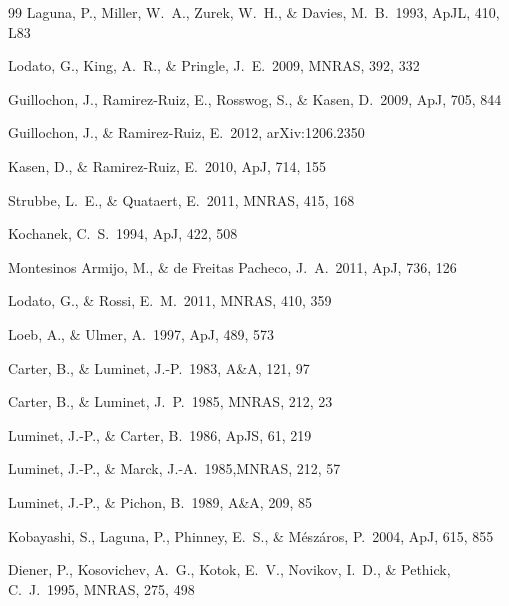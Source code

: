 \documentclass[useAMS, twocolumn, usenatbib]{mn2e}
\begin{document}
\begin{thebibliography}{99}
 Laguna, P., Miller, 
W.~A., Zurek, W.~H., \& Davies, M.~B.\ 1993, ApJL, 410, L83 

 Lodato, G., King, A.~R., 
\& Pringle, J.~E.\ 2009, MNRAS, 392, 332 

 Guillochon, J., 
Ramirez-Ruiz, E., Rosswog, S., \& Kasen, D.\ 2009, ApJ, 705, 844 

 Guillochon, J., \& Ramirez-Ruiz, E.\ 2012, arXiv:1206.2350 

 Kasen, D., \& Ramirez-Ruiz, E.\ 2010, ApJ, 714, 155 

 Strubbe, L.~E., \& Quataert, E.\ 2011, MNRAS, 415, 168 

 Kochanek, C.~S.\ 1994, ApJ, 
422, 508

 Montesinos Armijo, M., \& de Freitas Pacheco, J.~A.\ 2011, ApJ, 736, 126 

 Lodato, G., \& Rossi, E.~M.\ 2011, MNRAS, 410, 359 

 Loeb, A., \& Ulmer, A.\ 1997, ApJ, 489, 573 

 Carter, B., \& Luminet, J.-P.\ 1983, A\&A, 121, 97 

 Carter, B., \& Luminet, J.~P.\ 1985, MNRAS, 212, 23 

 Luminet, J.-P., \& Carter, B.\ 1986, ApJS, 61, 219 

 Luminet, J.-P., \& Marck, J.-A.\ 1985,MNRAS, 212, 57 

 Luminet, J.-P., \& Pichon, B.\ 1989, A\&A, 209, 85 

 Kobayashi, S., 
Laguna, P., Phinney, E.~S., \& M{\'e}sz{\'a}ros, P.\ 2004, ApJ, 615, 855 

 Diener, P., Kosovichev, 
A.~G., Kotok, E.~V., Novikov, I.~D., 
\& Pethick, C.~J.\ 1995, MNRAS, 275, 498 


\end{thebibliography}
\end{document}
